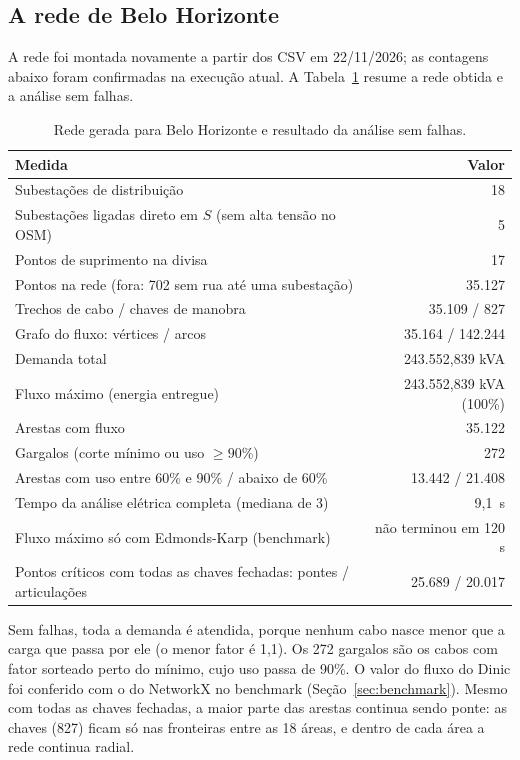 \documentclass[12pt]{article}
\begin{document}
\subsection{A rede de Belo Horizonte}
\label{sec:resultados-rede}

A rede foi montada novamente a partir dos CSV em 22/11/2026; as contagens abaixo foram confirmadas na execução atual. A Tabela~\ref{tab:rede} resume a rede obtida e a análise sem falhas.

\begin{table}[ht]
\centering
\caption{Rede gerada para Belo Horizonte e resultado da análise sem falhas.}
\label{tab:rede}
\begin{tabularx}{\textwidth}{Xr}
\toprule
\textbf{Medida} & \textbf{Valor} \\
\midrule
Subestações de distribuição & 18 \\
Subestações ligadas direto em $S$ (sem alta tensão no OSM) & 5 \\
Pontos de suprimento na divisa & 17 \\
Pontos na rede (fora: 702 sem rua até uma subestação) & 35.127 \\
Trechos de cabo / chaves de manobra & 35.109 / 827 \\
Grafo do fluxo: vértices / arcos & 35.164 / 142.244 \\
\midrule
Demanda total & 243.552,839 kVA \\
Fluxo máximo (energia entregue) & 243.552,839 kVA (100\%) \\
Arestas com fluxo & 35.122 \\
Gargalos (corte mínimo ou uso $\geq 90\%$) & 272 \\
Arestas com uso entre 60\% e 90\% / abaixo de 60\% & 13.442 / 21.408 \\
Tempo da análise elétrica completa (mediana de 3) & 9,1~s \\
Fluxo máximo só com Edmonds-Karp (benchmark) & não terminou em 120 s \\
\midrule
Pontos críticos com todas as chaves fechadas: pontes / articulações & 25.689 / 20.017 \\
\bottomrule
\end{tabularx}
\end{table}

Sem falhas, toda a demanda é atendida, porque nenhum cabo nasce menor que a carga que passa por ele (o menor fator é 1,1). Os 272 gargalos são os cabos com fator sorteado perto do mínimo, cujo uso passa de 90\%. O valor do fluxo do Dinic foi conferido com o do NetworkX no benchmark (Seção~\ref{sec:benchmark}). Mesmo com todas as chaves fechadas, a maior parte das arestas continua sendo ponte: as chaves (827) ficam só nas fronteiras entre as 18 áreas, e dentro de cada área a rede continua radial.
\end{document}
